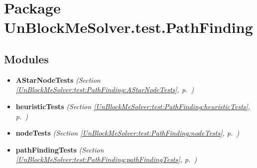 %
%
%


\section{Package UnBlockMeSolver.test.PathFinding}

    \label{UnBlockMeSolver:test:PathFinding}


\subsection{Modules}

\begin{itemize}
\setlength{\parskip}{0ex}
\item \textbf{AStarNodeTests}
  \textit{(Section \ref{UnBlockMeSolver:test:PathFinding:AStarNodeTests}, p.~\pageref{UnBlockMeSolver:test:PathFinding:AStarNodeTests})}

\item \textbf{heuristicTests}
  \textit{(Section \ref{UnBlockMeSolver:test:PathFinding:heuristicTests}, p.~\pageref{UnBlockMeSolver:test:PathFinding:heuristicTests})}

\item \textbf{nodeTests}
  \textit{(Section \ref{UnBlockMeSolver:test:PathFinding:nodeTests}, p.~\pageref{UnBlockMeSolver:test:PathFinding:nodeTests})}

\item \textbf{pathFindingTests}
  \textit{(Section \ref{UnBlockMeSolver:test:PathFinding:pathFindingTests}, p.~\pageref{UnBlockMeSolver:test:PathFinding:pathFindingTests})}

\end{itemize}



